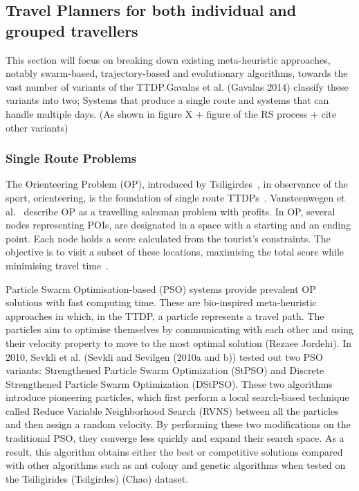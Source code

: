 \subsection{Travel Planners for both individual and grouped travellers}

This section will focus on breaking down existing meta-heuristic approaches,
notably swarm-based, trajectory-based and evolutionary algorithms, towards the
vast number of variants of the TTDP.\@ Gavalas et al. (Gavalas 2014) classify
these variants into two; Systems that produce a single route and systems that
can handle multiple days. (As shown in figure X + figure of the RS process +
cite other variants)

\subsubsection{Single Route Problems}

The Orienteering Problem (OP), introduced by Tsiligirdes~\cite{Tsiligirides1984},
in observance of the sport, orienteering, is the foundation of single route
TTDPs~\cite{Herzog2020}. Vansteenwegen et al.~\cite{Vansteenwegen2011b} describe
OP as a travelling salesman problem with profits. In OP, several nodes
representing POIs, are designated in a space with a starting and an ending
point. Each node holds a score calculated from the tourist's constraints. The
objective is to visit a subset of these locations, maximising the total score
while minimising travel time~\cite{Sylejmani2017}.

Particle Swarm Optimisation-based (PSO) systems provide prevalent OP solutions
with fast computing time. These are bio-inspired meta-heuristic approaches in
which, in the TTDP, a particle represents a travel path. The particles aim to
optimise themselves by communicating with each other and using their velocity
property to move to the most optimal solution (Rezaee Jordehi). In 2010, Sevkli
et al.  (Sevkli and Sevilgen (2010a and b)) tested out two PSO variants:
Strengthened Particle Swarm Optimization (StPSO) and Discrete Strengthened
Particle Swarm Optimization (DStPSO). These two algorithms introduce pioneering
particles, which first perform a local search-based technique called Reduce
Variable Neighborhood Search (RVNS) between all the particles and then assign a
random velocity. By performing these two modifications on the traditional PSO,
they converge less quickly and expand their search space. As a result, this
algorithm obtains either the best or competitive solutions compared with other
algorithms such as ant colony and genetic algorithms when tested on the
Tsiligirides (Tsilgirdes) (Chao) dataset.


